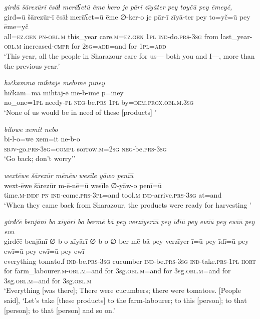 \ea \label{PM.38}
\textit{girđū šārezūrī ēsāɫ merāʕetū ēme kero je pārī zīyāter pey toyčū pey ēmeyč,} \\ 
\gll girđ=ū šārezūr-ī ēsāɫ merāʕet=ū ēme ∅-ker-o je pār-ī zīyā-ter pey to=yč=ū pey ēme=yč \\ 
 all\textsc{\textsc{=ez.gen}} \textsc{pn}\textsc{-obl}\textsc{.m} this\_year care\textsc{.m}\textsc{\textsc{=ez.gen}} \textsc{1pl} \textsc{ind-}do\textsc{.prs}\textsc{-3sg} from last\_year\textsc{-obl}\textsc{.m} increased\textsc{-cmpr} for \textsc{2sg}\textsc{=add}=and for \textsc{1pl}\textsc{=add} \\ 
\glt `This year, all the people in Sharazour care for us— both you and I—, more than the previous year.'
\z 
 
\ea \label{PM.39}
\textit{hīčkāmmā mihtājē mebīmē pīney} \\ 
\gll hīčkām=mā mihtāj-ē me-b-īmē p=īney \\ 
 no\_one\textsc{=1pl} needy\textsc{\textsc{-pl}} \textsc{neg-}be\textsc{.prs} \textsc{1pl} by=\textsc{dem.prox}\textsc{.obl}\textsc{.m}\textsc{.3sg} \\ 
\glt `None of us would be in need of these [products] '
\z 
 
\ea \label{PM.40}
\textit{bilowe xemit nebo} \\ 
\gll bi-l-o=we xem=it ne-b-o \\ 
 \textsc{sbjv-}go\textsc{.prs}\textsc{-3sg}\textsc{=compl} sorrow\textsc{.m}\textsc{=\textsc{2sg}} \textsc{neg-}be\textsc{.prs}\textsc{-3sg} \\ 
\glt `Go back; don’t worry’'
\z 
 
\ea \label{PM.41}
\textit{wextēwe šārezūr mēnēw wesīle yāwo penīū} \\ 
\gll wext-ēwe šārezūr m-ē-nē=ū wesīle ∅-yāw-o penī=ū \\ 
 time\textsc{.m}\textsc{-indf} \textsc{pn} \textsc{ind-}come\textsc{.prs}\textsc{-3pl}=and tool\textsc{.m} \textsc{ind-}arrive\textsc{.prs}\textsc{-3sg} at=and \\ 
\glt `When they came back from Sharazour, the products were ready for harvesting  '
\z 
 
\ea \label{PM.43}
\textit{girđčē benjānī bo xīyārī bo bermē bā pey verzīyerīū pey īđīū pey ewīū pey ewīū pey ewī} \\ 
\gll girđčē benjānī ∅-b-o xīyārī ∅-b-o ∅-ber-mē bā pey verzīyer-ī=ū pey īđī=ū pey ewī=ū pey ewī=ū pey ewī \\ 
 everything tomato.f \textsc{ind-}be\textsc{.prs}\textsc{-3sg} cucumber \textsc{ind-}be\textsc{.prs}\textsc{-3sg} \textsc{ind-}take\textsc{.prs}\textsc{-1pl} \textsc{hort} for farm\_labourer\textsc{.m}\textsc{-obl}\textsc{.m}=and for 3sg\textsc{.obl}\textsc{.m}=and for 3sg\textsc{.obl}\textsc{.m}=and for 3sg\textsc{.obl}\textsc{.m}=and for 3sg\textsc{.obl}\textsc{.m} \\ 
\glt `Everything [was there]; There were cucumbers; there were tomatoes. [People said], ‘Let’s take [these products] to the farm-labourer; to this [person]; to that [person]; to that [person] and so on.'
\z 
 
